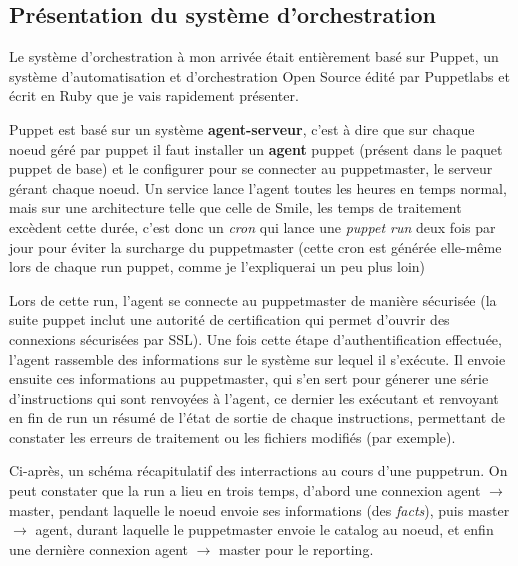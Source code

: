 \documentclass[14 pt,a4paper]{extreport}
\begin{document}
\subsection{Présentation du système d'orchestration}

Le système d'orchestration à mon arrivée était entièrement basé sur Puppet, un système d'automatisation et d'orchestration Open Source édité par Puppetlabs et écrit en Ruby que je vais rapidement présenter.

Puppet est basé sur un système \textbf{agent-serveur}, c'est à dire que sur chaque noeud géré par puppet il faut installer un \textbf{agent} puppet (présent dans le paquet puppet de base) et le configurer pour se connecter au puppetmaster, le serveur gérant chaque noeud. Un service lance l'agent toutes les heures en temps normal, mais sur une architecture telle que celle de Smile, les temps de traitement excèdent cette durée, c'est donc un \emph{cron} qui lance une \emph{puppet run} deux fois par jour pour éviter la surcharge du puppetmaster (cette cron est générée elle-même lors de chaque run puppet, comme je l'expliquerai un peu plus loin)

Lors de cette run, l'agent se connecte au puppetmaster de manière sécurisée (la suite puppet inclut une autorité de certification qui permet d'ouvrir des connexions sécurisées par SSL). Une fois cette étape d'authentification effectuée, l'agent rassemble des informations sur le système sur lequel il s'exécute. Il envoie ensuite ces informations au puppetmaster, qui s'en sert pour génerer une série d'instructions qui sont renvoyées à l'agent, ce dernier les exécutant et renvoyant en fin de run un résumé de l'état de sortie de chaque instructions, permettant de constater les erreurs de traitement ou les fichiers modifiés (par exemple).

Ci-après, un schéma récapitulatif des interractions au cours d'une puppetrun. On peut constater que la run a lieu en trois temps, d'abord une connexion agent $\rightarrow$ master, pendant laquelle le noeud envoie ses informations (des \emph{facts}), puis master $\rightarrow$ agent, durant laquelle le puppetmaster envoie le catalog au noeud, et enfin une dernière connexion agent $\rightarrow$ master pour le reporting.
\end{document}
